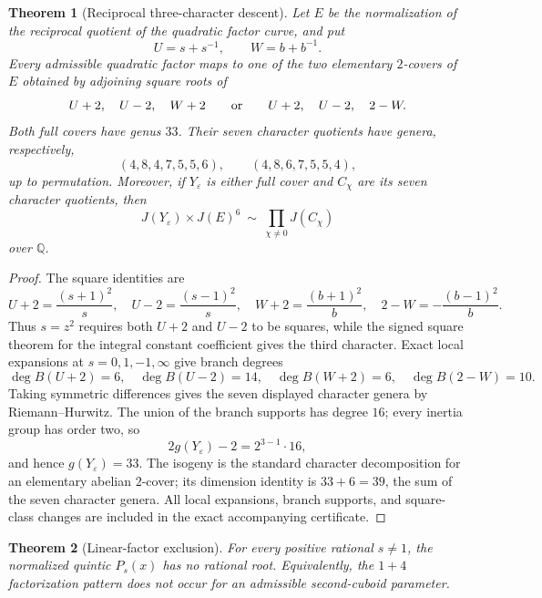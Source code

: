 \documentclass[11pt]{article}
\newtheorem{theorem}{Theorem}
\begin{document}
\begin{theorem}[Reciprocal three-character descent]
Let $E$ be the normalization of the reciprocal quotient of the quadratic
factor curve, and put
\[
 U=s+s^{-1},\qquad W=b+b^{-1}.
\]
Every admissible quadratic factor maps to one of the two elementary
$2$-covers of $E$ obtained by adjoining square roots of
\[
 U+2,\quad U-2,\quad W+2
 \qquad\hbox{or}\qquad
 U+2,\quad U-2,\quad 2-W.
\]
Both full covers have genus $33$.  Their seven character quotients have
genera, respectively,
\[
 (4,8,4,7,5,5,6),\qquad (4,8,6,7,5,5,4),
\]
up to permutation.  Moreover, if $Y_\varepsilon$ is either full cover and
$C_\chi$ are its seven character quotients, then
\[
 J(Y_\varepsilon)\times J(E)^6
 \ \sim\ \prod_{\chi\ne0}J(C_\chi)
\]
over $\mathbb Q$.
\end{theorem}

\begin{proof}
The square identities are
\[
 U+2=\frac{(s+1)^2}{s},\quad
 U-2=\frac{(s-1)^2}{s},\quad
 W+2=\frac{(b+1)^2}{b},\quad
 2-W=-\frac{(b-1)^2}{b}.
\]
Thus $s=z^2$ requires both $U+2$ and $U-2$ to be squares, while the signed
square theorem for the integral constant coefficient gives the third
character.  Exact local expansions at $s=0,1,-1,\infty$ give branch degrees
\[
 \deg B(U+2)=6,\quad \deg B(U-2)=14,\quad
 \deg B(W+2)=6,\quad \deg B(2-W)=10.
\]
Taking symmetric differences gives the seven displayed character genera by
Riemann--Hurwitz.  The union of the branch supports has degree $16$; every
inertia group has order two, so
\[
 2g(Y_\varepsilon)-2=2^{3-1}\cdot16,
\]
and hence $g(Y_\varepsilon)=33$.  The isogeny is the standard character
decomposition for an elementary abelian $2$-cover; its dimension identity is
$33+6=39$, the sum of the seven character genera.  All local expansions,
branch supports, and square-class changes are included in the exact
accompanying certificate.
\end{proof}

\begin{theorem}[Linear-factor exclusion]
For every positive rational $s\ne1$, the normalized quintic $P_s(x)$ has no
rational root.  Equivalently, the $1+4$ factorization pattern does not occur
for an admissible second-cuboid parameter.
\end{theorem}
\end{document}
